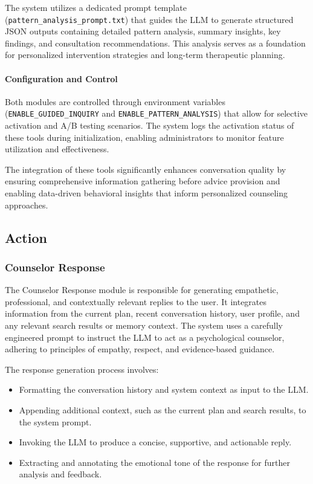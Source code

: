 The system utilizes a dedicated prompt template (\texttt{pattern\_analysis\_prompt.txt}) that guides the LLM to generate structured JSON outputs containing detailed pattern analysis, summary insights, key findings, and consultation recommendations. This analysis serves as a foundation for personalized intervention strategies and long-term therapeutic planning.

\paragraph{Configuration and Control}

Both modules are controlled through environment variables (\texttt{ENABLE\_GUIDED\_INQUIRY} and \texttt{ENABLE\_PATTERN\_ANALYSIS}) that allow for selective activation and A/B testing scenarios. The system logs the activation status of these tools during initialization, enabling administrators to monitor feature utilization and effectiveness.

The integration of these tools significantly enhances conversation quality by ensuring comprehensive information gathering before advice provision and enabling data-driven behavioral insights that inform personalized counseling approaches.

\subsection{Action}

\subsubsection{Counselor Response}

The Counselor Response module is responsible for generating empathetic, professional, and contextually relevant replies to the user. It integrates information from the current plan, recent conversation history, user profile, and any relevant search results or memory context. The system uses a carefully engineered prompt to instruct the LLM to act as a psychological counselor, adhering to principles of empathy, respect, and evidence-based guidance.

The response generation process involves:
\begin{itemize}
    \item Formatting the conversation history and system context as input to the LLM.
    \item Appending additional context, such as the current plan and search results, to the system prompt.
    \item Invoking the LLM to produce a concise, supportive, and actionable reply.
    \item Extracting and annotating the emotional tone of the response for further analysis and feedback.
\end{itemize}

